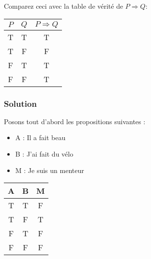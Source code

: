 Comparez ceci avec la table de vérité de $P \Rightarrow Q$:

\begin{center}
\begin{tabular}{c c | c}
$P$ & $Q$ & $P \Rightarrow Q$ \\
\hline
 T & T & T \\
 T & F & F \\
 F & T & T \\
 F & F & T
\end{tabular}
\end{center}



\subsubsection*{Solution}
    
    Posons tout d'abord les propositions suivantes :
    \begin{itemize}
        \item A : Il a fait beau
        \item B : J'ai fait du vélo
        \item M : Je suis un menteur
    \end{itemize}
    
    
    \begin{center}
    	\begin{tabular}{cc|c}
    		A & B & M\\
    		\hline
    		T & T & F\\
    		T & F & T\\
    		F & T & F\\
    		F & F & F\\
    	\end{tabular}
    \end{center}


% 

